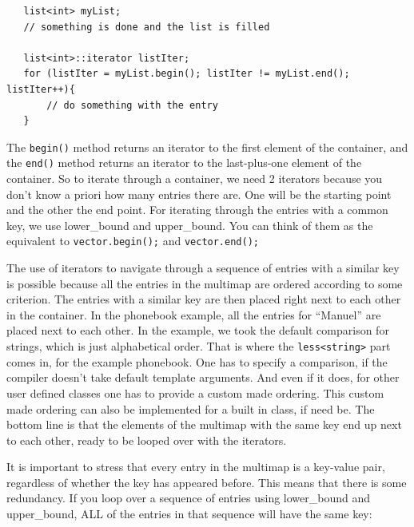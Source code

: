 \begin{footnotesize}
\begin{verbatim}
   list<int> myList;
   // something is done and the list is filled

   list<int>::iterator listIter;
   for (listIter = myList.begin(); listIter != myList.end(); listIter++){
       // do something with the entry
   }
\end{verbatim}
\end{footnotesize}

The \texttt{begin()} method returns an
iterator to the first element of the container, 
and the \texttt{end()} method returns an 
iterator to the last-plus-one element of the container.  So to iterate through
a container, we need 2 iterators because you don't know a priori how many entries there are.
One will be the starting point
and the other the end point.
For iterating through the entries with a common key, we use lower\_bound and upper\_bound.
You can think of them as the equivalent to
\texttt{vector.begin();} and
\texttt{vector.end();}

The use of iterators to navigate through a sequence of entries with a similar key is
possible because all the entries in the multimap are ordered according to some
criterion.  The entries with a similar key are then placed right next to each
other in the container.  In the phonebook example, all the entries for ``Manuel''
are placed next to each other.  In the example, we took the default comparison
for strings, which is just alphabetical order.  That is where the \verb+less<string>+
part comes in, for the example phonebook.  One has to specify a comparison, if the
compiler doesn't take default template arguments.  And even if it does, for other
user defined classes one
has to provide a custom made ordering.  This custom made ordering can also be
implemented for a built in class, if need be.
The bottom line is that the elements of the
multimap with the same key end up next to each other, ready to be looped over
with the iterators.


      It is important to stress that every entry in the multimap is a key-value pair,
      regardless of whether the key has appeared before.  This means that there is some
      redundancy.  If you loop over a sequence of entries using lower\_bound and
      upper\_bound, ALL of the entries in that sequence will have the same key:

